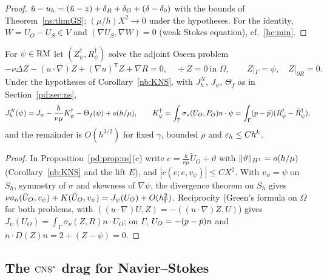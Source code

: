 \begin{proof}
$\tilde u-u_h=(\tilde u-z)+\delta_R+\delta_G+(\delta-\delta_0)$ with the bounds of Theorem~\ref{ns:thmGS}; $(\mu/h)X^2\to0$ under the hypotheses. For the identity, $W=U_O-U_S\in V$ and $(\nabla U_S,\nabla W)=0$ (weak Stokes equation), cf.\ \eqref{hc:min}.
\end{proof}

\begin{corollary}\label{nb:gsdrag}
For $\psi\in\mathrm{RM}$ let $(Z^\dagger_\psi,R^\dagger_\psi)$ solve the adjoint Oseen problem
\begin{equation}\label{nb:adj}
-\nu\Delta Z-(u\cdot\nabla)Z+(\nabla u)^{\mathsf T}Z+\nabla R=0,\quad\div Z=0\ \text{in }\Omega,\qquad Z|_\Gamma=\psi,\quad Z|_{\partial R}=0 .
\end{equation}
Under the hypotheses of Corollary~\ref{nb:KNS}, with $J^N_h$, $J_\psi$, $\Theta_f$ as in Section~\ref{pd:sec:ns},
\[
J^N_h(\psi)=J_\psi-\frac h{\nu\mu}K^\dagger_\psi-\Theta_f(\psi)+o(h/\mu),\qquad K^\dagger_\psi=\int_\Gamma\sigma_\nu(U_O,P_O)n\cdot\psi=\int_\Gamma(p-\bar p)(R^\dagger_\psi-\bar R^\dagger_\psi),
\]
and the remainder is $O(h^{3/2})$ for fixed $\gamma$, bounded $\rho$ and $\varepsilon_h\le Ch^k$.
\end{corollary}

\begin{proof}
In Proposition~\ref{pd:prop:ns}(c) write $e=\frac h{\nu\mu}\tilde U_O+\vartheta$ with $\lVert \vartheta\rVert_{H^1}=o(h/\mu)$ (Corollary~\ref{nb:KNS} and the lift $E$), and $|c(e;e,v_\psi)|\le CX^2$. With $v_\psi=\psi$ on $S_h$, symmetry of $\sigma$ and skewness of $\nabla\psi$, the divergence theorem on $S_h$ gives $\nu a_h(\tilde U_O,v_\psi)+K(\tilde U_O,v_\psi)=J_\psi(U_O)+O(h_\Gamma^2)$. Reciprocity (Green's formula on $\Omega$ for both problems, with $((u\cdot\nabla)U,Z)=-((u\cdot\nabla)Z,U)$) gives $J_\psi(U_O)=\int_\Gamma\sigma_\nu(Z,R)n\cdot U_O$; on $\Gamma$, $U_O=-(p-\bar p)n$ and $n\cdot D(Z)n=2\div(Z-\psi)=0$.
\end{proof}

\subsection{The $\mathrm{CNS}^\ast$ drag for Navier--Stokes}\label{n2:adj}

